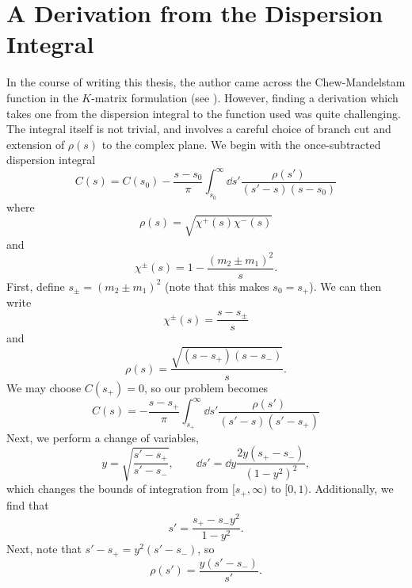 \section{A Derivation from the Dispersion Integral}\label{sec:chew-mandelstam}

In the course of writing this thesis, the author came across the Chew-Mandelstam function in the $K$-matrix formulation (see ). However, finding a derivation which takes one from the dispersion integral to the function used was quite challenging. The integral itself is not trivial, and involves a careful choice of branch cut and extension of $\rho(s)$ to the complex plane. We begin with the once-subtracted dispersion integral
\begin{equation}
    C(s) = C(s_0) - \frac{s - s_0}{\pi} \int_{s_0}^{\infty} \dd{s'} \frac{\rho(s')}{(s'-s)(s-s_0)}
\end{equation}
where
\begin{equation}
    \rho(s) = \sqrt{\chi^+(s)\chi^-(s)}
\end{equation}
and
\begin{equation}
    \chi^{\pm}(s) = 1 - \frac{(m_2 \pm m_1)^2}{s}.
\end{equation}
First, define $s_\pm = (m_2 \pm m_1)^2$ (note that this makes $s_0 = s_+$). We can then write
\begin{equation}
    \chi^{\pm}(s) = \frac{s - s_\pm}{s}
\end{equation}
and
\begin{equation}
    \rho(s) = \frac{\sqrt{(s-s_+)(s-s_-)}}{s}.
\end{equation}
We may choose $C(s_+) = 0$, so our problem becomes
\begin{equation}
    C(s) = -\frac{s-s_+}{\pi} \int_{s_+}^{\infty} \dd{s'} \frac{\rho(s')}{(s'-s)(s'-s_+)}
\end{equation}
Next, we perform a change of variables,
\begin{equation}
    y = \sqrt{\frac{s' - s_+}{s' - s_-}},\qquad \dd{s'} = \dd{y}\frac{2 y (s_+ - s_-)}{(1 - y^2)^2},
\end{equation}
which changes the bounds of integration from $[s_+,\infty)$ to $[0,1)$. Additionally, we find that
\begin{equation}
    s' = \frac{s_+ - s_- y^2}{1-y^2}.
\end{equation}
Next, note that $s' - s_+ = y^2(s' - s_-)$, so
\begin{equation}
    \rho(s') = \frac{y(s' - s_-)}{s'}.
\end{equation}
